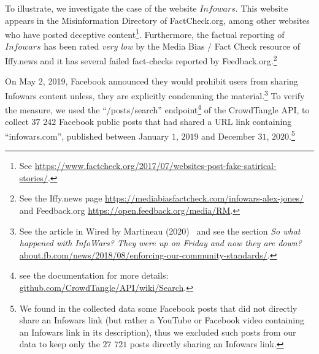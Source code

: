 \documentclass{article}
\begin{document}

\smallskip

To illustrate, we investigate the case of the website $Infowars$. This website appears in the Misinformation Directory of FactCheck.org, among other websites who have posted deceptive content\footnote{See \href{https://www.factcheck.org/2017/07/websites-post-fake-satirical-stories/}{https://www.factcheck.org/2017/07/websites-post-fake-satirical-stories/}.}. Furthermore, the factual reporting of $Infowars$ has been rated {\it very low} by the Media Bias / Fact Check resource of Iffy.news and it has several failed fact-checks reported by Feedback.org.\footnote{See the Iffy.news page \href{https://mediabiasfactcheck.com/infowars-alex-jones/}{https://mediabiasfactcheck.com/infowars-alex-jones/} and Feedback.org \href{https://open.feedback.org/media/RM}{https://open.feedback.org/media/RM}.} 

On May 2, 2019, Facebook announced they would prohibit users from sharing Infowars content unless, they are explicitly condemning the material.\footnote{See the article in Wired by Martineau (2020)~\cite{wiredalexjones} and see the section {\it So what happened with InfoWars? They were up on Friday and now they are down?} \href{https://about.fb.com/news/2018/08/enforcing-our-community-standards/}{about.fb.com/news/2018/08/enforcing-our-community-standards/}.} To verify the measure, we used the ``/posts/search'' endpoint\footnote{see the documentation for more details: \href{https://github.com/CrowdTangle/API/wiki/Search}{github.com/CrowdTangle/API/wiki/Search}.} of the CrowdTangle API, to collect $37$ $242$ Facebook public posts that had shared a URL link containing ``infowars.com'', published between January $1$, $2019$ and December $31$, $2020$.\footnote{We found in the collected data some Facebook posts that did not directly share an Infowars link (but rather a YouTube or Facebook video containing an Infowars link in its description), thus we excluded such posts from our data to keep only the $27$ $721$ posts directly sharing an Infowars link.} 
\end{document}
